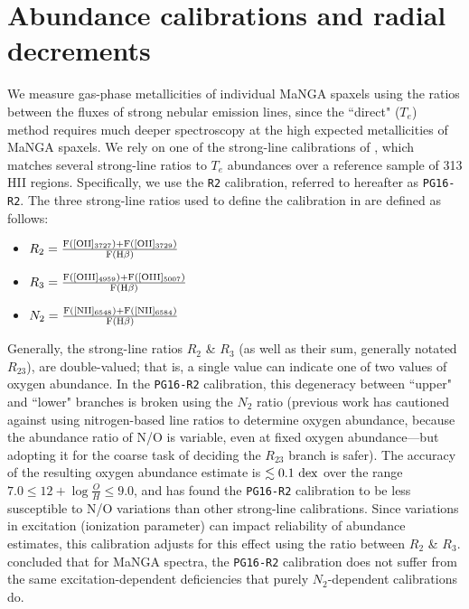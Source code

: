 \section{Abundance calibrations and radial decrements}
\label{sec:abund_meas_grad_dec}

We measure gas-phase metallicities of individual MaNGA spaxels using the ratios between the fluxes of strong nebular emission lines, since the ``direct" ($T_e$) method requires much deeper spectroscopy at the high expected metallicities of MaNGA spaxels. We rely on one of the strong-line calibrations of \citet[][hereafter, ]{pilyugin_grebel_2016}, which matches several strong-line ratios to $T_e$ abundances over a reference sample of 313 HII regions. Specifically, we use the \texttt{R2} calibration, referred to hereafter as \texttt{PG16-R2}. The three strong-line ratios used to define the calibration in  are defined as follows:

\begin{itemize}
    \item $R_2 = \frac{\rm F([OII]_{3727}) + F([OII]_{3729})}{\rm F(H \beta)}$
    \item $R_3 = \frac{\rm F([OIII]_{4959}) + F([OIII]_{5007})}{\rm F(H \beta)}$
    \item $N_2 = \frac{\rm F([NII]_{6548}) + F([NII]_{6584})}{\rm F(H \beta)}$
\end{itemize}

Generally, the strong-line ratios $R_2$ \& $R_3$ (as well as their sum, generally notated $R_{23}$), are double-valued; that is, a single value can indicate one of two values of oxygen abundance. In the \texttt{PG16-R2} calibration, this degeneracy between ``upper" and ``lower" branches is broken using the $N_2$ ratio (previous work has cautioned against using nitrogen-based line ratios to determine oxygen abundance, because the abundance ratio of N/O is variable, even at fixed oxygen abundance---but adopting it for the coarse task of deciding the $R_{23}$ branch is safer). The accuracy of the resulting oxygen abundance estimate is $\lesssim 0.1~{\rm dex}$ over the range $7.0 \le 12 + \log{\frac{O}{H}} \le 9.0$, and \citet{schaefer_19_ohno} has found the \texttt{PG16-R2} calibration to be less susceptible to N/O variations than other strong-line calibrations. Since variations in excitation (ionization parameter) can impact reliability of abundance estimates, this calibration adjusts for this effect using the ratio between $R_2$ \& $R_3$. \citep{pilyugin_grebel_2018_manga} concluded that for MaNGA spectra, the \texttt{PG16-R2} calibration does not suffer from the same excitation-dependent deficiencies that purely $N_2$-dependent calibrations do.

